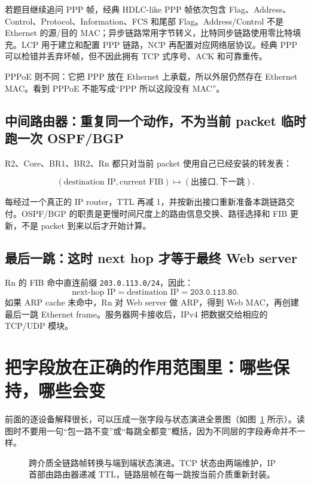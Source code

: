 \documentclass[UTF8,fontset=none,11pt,a4paper]{ctexart}
\begin{document}
若题目继续追问 PPP 帧，经典 HDLC-like PPP 帧依次包含 Flag、Address、Control、Protocol、Information、FCS 和尾部 Flag。Address/Control 不是 Ethernet 的源/目的 MAC；异步链路常用字节转义，比特同步链路使用零比特填充。LCP 用于建立和配置 PPP 链路，NCP 再配置对应网络层协议。经典 PPP 可以检错并丢弃坏帧，但不因此拥有 TCP 式序号、ACK 和可靠重传。

PPPoE 则不同：它把 PPP 放在 Ethernet 上承载，所以外层仍然存在 Ethernet MAC。看到 PPPoE 不能写成“PPP 所以这段没有 MAC”。

\subsection{中间路由器：重复同一个动作，不为当前 packet 临时跑一次 OSPF/BGP}

R2、Core、BR1、BR2、Rn 都只对当前 packet 使用自己已经安装的转发表：

\[
(\text{destination IP},\text{current FIB})
\mapsto
(\text{出接口},\text{下一跳}).
\]

每经过一个真正的 IP router，TTL 再减 1，并按新出接口重新准备本跳链路交付。OSPF/BGP 的职责是更慢时间尺度上的路由信息交换、路径选择和 FIB 更新，不是 packet 到来以后才开始计算。

\subsection{最后一跳：这时 next hop 才等于最终 Web server}

Rn 的 FIB 命中直连前缀 \texttt{203.0.113.0/24}，因此：
\[
\text{next-hop IP}=\text{destination IP}=\texttt{203.0.113.80}.
\]
如果 ARP cache 未命中，Rn 对 Web server 做 ARP，得到 Web MAC，再创建最后一跳 Ethernet frame。服务器网卡接收后，IPv4 把数据交给相应的 TCP/UDP 模块。

\section{把字段放在正确的作用范围里：哪些保持，哪些会变}

前面的逐设备解释很长，可以压成一张字段与状态演进全景图（如图~\ref{fig:field-lifetime} 所示）。读图时不要用一句“包一路不变”或“每跳全都变”概括，因为不同层的字段寿命并不一样。

\begin{figure}[!htbp]
  \centering
  \resizebox{0.92\linewidth}{!}{}
  \caption{跨介质全链路帧转换与端到端状态演进。TCP 状态由两端维护，IP 首部由路由器递减 TTL，链路层帧在每一跳按当前介质重新封装。}
  \label{fig:field-lifetime}
\end{figure}
\end{document}

